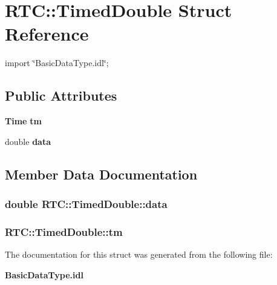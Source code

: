 \section{RTC::TimedDouble Struct Reference}
\label{structRTC_1_1TimedDouble}


{\ttfamily import \char`\"{}BasicDataType.idl\char`\"{};}

\subsection*{Public Attributes}
\begin{DoxyCompactItemize}
\item 
{\bf Time} {\bf tm}
\item 
double {\bf data}
\end{DoxyCompactItemize}


\subsection{Member Data Documentation}
\subsubsection[{data}]{\setlength{\rightskip}{0pt plus 5cm}double {\bf RTC::TimedDouble::data}}\label{structRTC_1_1TimedDouble_acd572c69d2c9ccbf144ea4d3873056d4}
\subsubsection[{tm}]{ {\bf RTC::TimedDouble::tm}}\label{structRTC_1_1TimedDouble_a4bf2f8c22004f0180be307ecda4413e2}


The documentation for this struct was generated from the following file:\begin{DoxyCompactItemize}
\item 
{\bf BasicDataType.idl}\end{DoxyCompactItemize}
